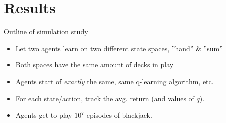 
\section{Results}

\begin{frame}{Outline of simulation study}

\begin{itemize}
  \item Let two agents learn on two different state spaces, ''hand'' \& ''sum''
  \item Both spaces have the same amount of decks in play
  \item Agents start of \textit{exactly} the same, same q-learning algorithm,  etc. 
  \item For each state/action, track the avg. return (and values of $q$). 
  \item Agents get to play $10^7$ episodes of blackjack. 
\end{itemize}

\end{frame}

